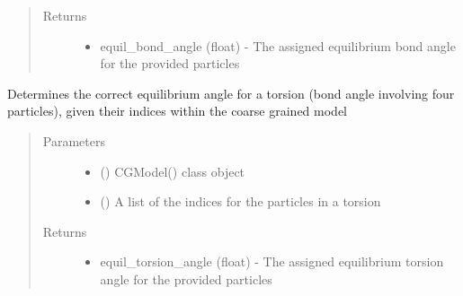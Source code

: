 \documentclass[letterpaper,12pt,english,openany,oneside]{sphinxmanual}
\begin{document}
\begin{fulllineitems}
\begin{fulllineitems}
\begin{quote}
\begin{description}
\item[{Returns}] \leavevmode
\begin{itemize}
\item {} 
equil\_bond\_angle (float) - The assigned equilibrium bond angle for the provided particles

\end{itemize}


\end{description}\end{quote}

\end{fulllineitems}


\begin{fulllineitems}
\label{\detokenize{cg_model:cg_model.cgmodel.CGModel.get_equil_torsion_angle}}
Determines the correct equilibrium angle for a torsion (bond angle involving four particles), given their indices within the coarse grained model
\begin{quote}\begin{description}
\item[{Parameters}] \leavevmode\begin{itemize}
\item {} 
 () \textendash{} CGModel() class object

\item {} 
 (\sphinxstyleliteralemphasis{\sphinxupquote{( }}\sphinxstyleliteralemphasis{\sphinxupquote{ )}}) \textendash{} A list of the indices for the particles in a torsion

\end{itemize}

\item[{Returns}] \leavevmode
\begin{itemize}
\item {} 
equil\_torsion\_angle (float) - The assigned equilibrium torsion angle for the provided particles


\end{itemize}
\end{description}
\end{quote}
\end{fulllineitems}
\end{fulllineitems}
\end{document}
